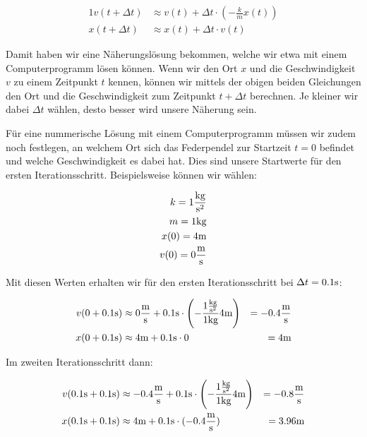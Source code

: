 \begin{alignat*}{1}
    v(t + \Delta t) &\approx v(t) + \Delta t \cdot \left(-\frac{k}{m}x(t)\right) \\
    x(t + \Delta t) &\approx x(t) + \Delta t \cdot v(t)
\end{alignat*}

Damit haben wir eine Näherungslösung bekommen, welche wir etwa mit einem Computerprogramm lösen können. Wenn wir den Ort $x$ und die Geschwindigkeit $v$ zu einem Zeitpunkt $t$ kennen, können wir mittels der obigen beiden Gleichungen den Ort und die Geschwindigkeit zum Zeitpunkt $t+\Delta t$ berechnen. Je kleiner wir dabei $\Delta t$ wählen, desto besser wird unsere Näherung sein.

Für eine nummerische Lösung mit einem Computerprogramm müssen wir zudem noch festlegen, an welchem Ort sich das Federpendel zur Startzeit $t=0$ befindet und welche Geschwindigkeit es dabei hat. Dies sind unsere Startwerte für den ersten Iterationsschritt. Beispielsweise können wir wählen:

\begin{alignat*}{1}
    k = 1 \frac{\text{kg}}{\text{s}^2} \\
    m = 1 \text{kg} \\
    x(0) = 4 \text{m} \\
    v(0) = 0 \frac{\text{m}}{\text{s}}
\end{alignat*}

Mit diesen Werten erhalten wir für den ersten Iterationsschritt  bei $\Delta t=0.1\text{s}$:

\begin{alignat*}{2}
    v(0 + 0.1 \text{s}) &\approx 0 \frac{\text{m}}{\text{s}} + 0.1 \text{s} \cdot \left(-\frac{1 \frac{\text{kg}}{\text{s}^2}}{1\text{kg}}4 \text{m} \right) &= -0.4 \frac{\text{m}}{\text{s}} \\
    x(0 + 0.1 \text{s}) &\approx 4 \text{m}     + 0.1 \text{s} \cdot 0                                          &= 4 \text{m}
\end{alignat*}

Im zweiten Iterationsschritt dann:

\begin{alignat*}{2}
    v(0.1\text{s} + 0.1 \text{s}) &\approx -0.4 \frac{\text{m}}{\text{s}} + 0.1 \text{s} \cdot \left(-\frac{1 \frac{\text{kg}}{\text{s}^2}}{1\text{kg}} 4 \text{m} \right) &= -0.8 \frac{\text{m}}{\text{s}} \\
    x(0.1\text{s} + 0.1 \text{s}) &\approx 4    \text{m}     + 0.1 \text{s} \cdot (-0.4 \frac{\text{m}}{\text{s}})                              &= 3.96 \text{m}
\end{alignat*}

